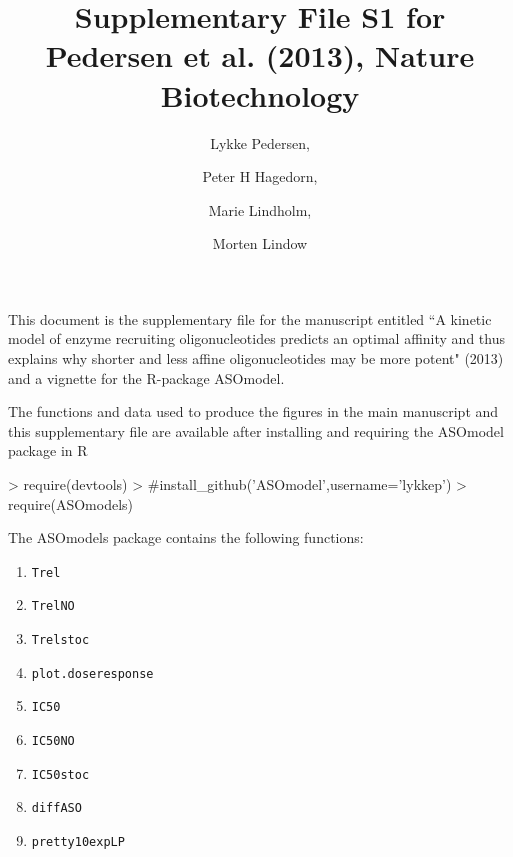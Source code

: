 \documentclass[a4paper,11pt]{article}
\title{Supplementary File S1 for Pedersen et al. (2013), Nature Biotechnology}
\author{Lykke Pedersen, \and Peter H Hagedorn, \and Marie Lindholm, \and Morten Lindow}
\date{}
\begin{document}

\maketitle

This document is the supplementary file for the manuscript entitled ``A kinetic model of enzyme recruiting oligonucleotides predicts an optimal affinity and thus explains why shorter and less affine oligonucleotides may be more potent" (2013) and a vignette for the R-package ASOmodel.


The functions and data used to produce the figures in the main manuscript and this supplementary file are available after installing and requiring the ASOmodel package in R
\begin{Schunk}
\begin{Sinput}
> require(devtools)
> #install_github('ASOmodel',username='lykkep')
> require(ASOmodels)
\end{Sinput}
\end{Schunk}
The ASOmodels package contains the following functions:
\begin{enumerate}
\item \texttt{Trel}
\item \texttt{TrelNO}
\item \texttt{Trelstoc}
\item \texttt{plot.doseresponse}
\item \texttt{IC50}
\item \texttt{IC50NO}
\item \texttt{IC50stoc}
\item \texttt{diffASO}
\item \texttt{pretty10expLP}
\end{enumerate}

\newpage

\tableofcontents
\end{document}
